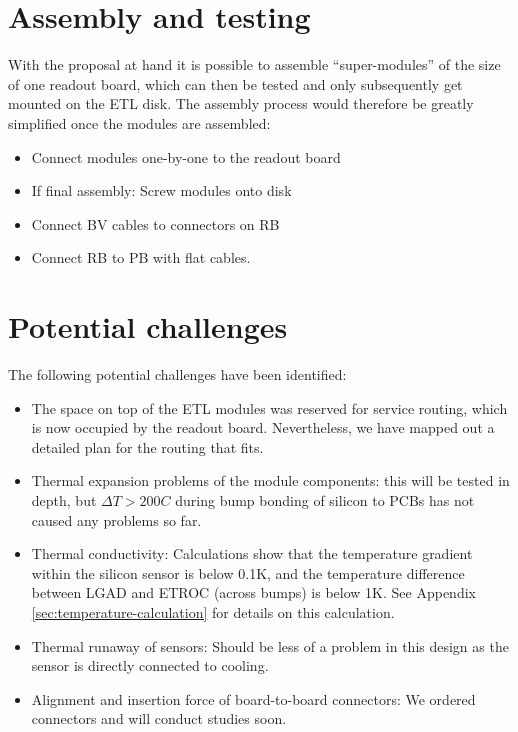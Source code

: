 \documentclass[11pt]{article}
\begin{document}
\section{Assembly and testing}

With the proposal at hand it is possible to assemble ``super-modules'' of the size of one readout board, which can then be tested and only subsequently get mounted on the ETL disk.
The assembly process would therefore be greatly simplified once the modules are assembled:
\begin{itemize}
  \item Connect modules one-by-one to the readout board
  \item If final assembly: Screw modules onto disk
  \item Connect BV cables to connectors on RB
  \item Connect RB to PB with flat cables.
\end{itemize}


\section{Potential challenges}

The following potential challenges have been identified:
\begin{itemize}
  \item The space on top of the ETL modules was reserved for service routing, which is now occupied by the readout board. Nevertheless, we have mapped out a detailed plan for the routing that fits.
  \item Thermal expansion problems of the module components: this will be tested in depth, but $\Delta T > 200C$ during bump bonding of silicon to PCBs has not caused any problems so far.
  \item Thermal conductivity: Calculations show that the temperature gradient within the silicon sensor is below 0.1K, and the temperature difference between LGAD and ETROC (across bumps) is below 1K. See Appendix \ref{sec:temperature-calculation} for details on this calculation.
  \item Thermal runaway of sensors: Should be less of a problem in this design as the sensor is directly connected to cooling.
  \item Alignment and insertion force of board-to-board connectors: We ordered connectors and will conduct studies soon.
\end{itemize}
\end{document}
